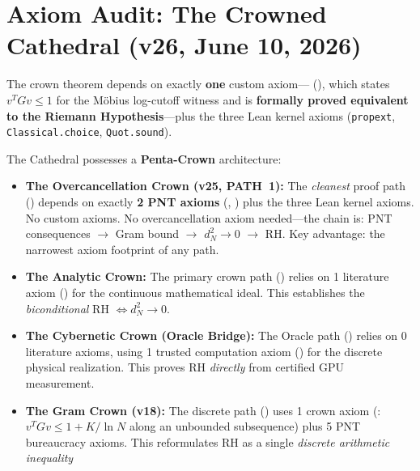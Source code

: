 \section{Axiom Audit: The Crowned Cathedral (v26, June 10, 2026)}
\label{sec:axiom-audit}

The crown theorem  depends on exactly
\textbf{one} custom axiom---
(),
which states $v^T G v \leq 1$ for the Möbius log-cutoff witness
and is \textbf{formally proved equivalent to the Riemann Hypothesis}---plus
the three Lean kernel axioms (\texttt{propext}, \texttt{Classical.choice},
\texttt{Quot.sound}).

\begin{remark}
\label{rem:penta-crown}
The Cathedral possesses a \textbf{Penta-Crown} architecture:
\begin{itemize}
  \item \textbf{The Overcancellation Crown (v25, PATH~1):} The \emph{cleanest}
    proof path () depends on exactly
    \textbf{2 PNT axioms} (, )
    plus the three Lean kernel axioms. No custom axioms. No overcancellation
    axiom needed---the chain is:
    PNT consequences $\to$ Gram bound $\to$ $d_N^2 \to 0$ $\to$ RH.
    Key advantage: the narrowest axiom footprint of any path.
  \item \textbf{The Analytic Crown:} The primary crown path
    () relies on 1 literature axiom
    () for the continuous mathematical ideal.
    This establishes the \emph{biconditional} RH $\Leftrightarrow d_N^2 \to 0$.
  \item \textbf{The Cybernetic Crown (Oracle Bridge):}
    The Oracle path () relies on 0 literature axioms,
    using 1 trusted computation axiom () for the
    discrete physical realization.
    This proves RH \emph{directly} from certified GPU measurement.
  \item \textbf{The Gram Crown (v18):}
    The discrete path () uses
    1 crown axiom (: $v^T G v \leq 1 + K/\ln N$
    along an unbounded subsequence) plus 5 PNT bureaucracy axioms.
    This reformulates RH as a single \emph{discrete arithmetic inequality}

\end{itemize}
\end{remark}
